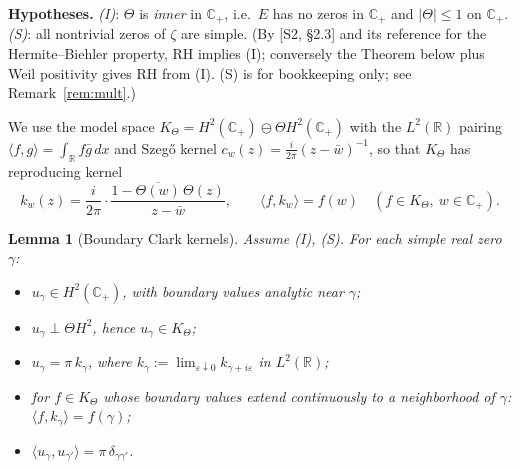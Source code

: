 \documentclass[11pt]{article}
\newtheorem{lemma}[theorem]{Lemma}
\newcommand{\C}{\mathbb{C}}
\newcommand{\R}{\mathbb{R}}
\newcommand{\Hp}{\C_{+}}
\newcommand{\Th}{\Theta}
\begin{document}
\noindent\textbf{Hypotheses.} \emph{(I)}: $\Th$ is \emph{inner} in $\Hp$, i.e.\
$E$ has no zeros in $\Hp$ and $|\Th|\le1$ on $\Hp$. \emph{(S)}: all nontrivial
zeros of $\zeta$ are simple. (By [S2, \S2.3] and its reference for the
Hermite--Biehler property, RH implies (I); conversely the Theorem below plus
Weil positivity gives RH from (I). (S) is for bookkeeping only; see
Remark~\ref{rem:mult}.)

We use the model space $K_\Th=H^2(\Hp)\ominus\Th H^2(\Hp)$ with the $L^2(\R)$
pairing $\langle f,g\rangle=\int_\R f\bar g\,dx$ and Szeg\H{o} kernel
$c_w(z)=\tfrac{i}{2\pi}(z-\bar w)^{-1}$, so that $K_\Th$ has reproducing kernel
\[ k_w(z)=\frac{i}{2\pi}\cdot\frac{1-\overline{\Th(w)}\,\Th(z)}{z-\bar w},
\qquad \langle f,k_w\rangle=f(w)\quad(f\in K_\Th,\ w\in\Hp). \]

\begin{lemma}[Boundary Clark kernels]\label{lem:clark}
Assume (I), (S). For each simple real zero $\gamma$:
\begin{itemize}
\item[(a)] $u_\gamma\in H^2(\Hp)$, with boundary values analytic near $\gamma$;
\item[(b)] $u_\gamma\perp\Th H^2$, hence $u_\gamma\in K_\Th$;
\item[(c)] $u_\gamma=\pi\,k_\gamma$, where
$k_\gamma:=\lim_{\varepsilon\downarrow0}k_{\gamma+i\varepsilon}$ in $L^2(\R)$;
\item[(d)] for $f\in K_\Th$ whose boundary values extend continuously to a
neighborhood of $\gamma$: $\langle f,k_\gamma\rangle=f(\gamma)$;
\item[(e)] $\langle u_\gamma,u_{\gamma'}\rangle=\pi\,\delta_{\gamma\gamma'}$.
\end{itemize}
\end{lemma}
\end{document}

